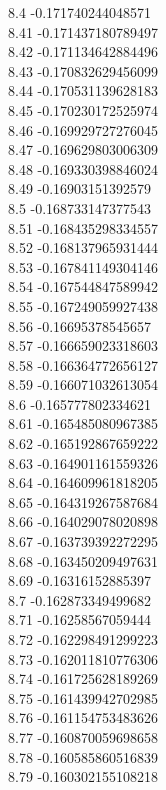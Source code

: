{8.4	-0.171740244048571\\
8.41	-0.171437180789497\\
8.42	-0.171134642884496\\
8.43	-0.170832629456099\\
8.44	-0.170531139628183\\
8.45	-0.170230172525974\\
8.46	-0.169929727276045\\
8.47	-0.169629803006309\\
8.48	-0.169330398846024\\
8.49	-0.16903151392579\\
8.5	-0.168733147377543\\
8.51	-0.168435298334557\\
8.52	-0.168137965931444\\
8.53	-0.167841149304146\\
8.54	-0.167544847589942\\
8.55	-0.167249059927438\\
8.56	-0.16695378545657\\
8.57	-0.166659023318603\\
8.58	-0.166364772656127\\
8.59	-0.166071032613054\\
8.6	-0.165777802334621\\
8.61	-0.165485080967385\\
8.62	-0.165192867659222\\
8.63	-0.164901161559326\\
8.64	-0.164609961818205\\
8.65	-0.164319267587684\\
8.66	-0.164029078020898\\
8.67	-0.163739392272295\\
8.68	-0.163450209497631\\
8.69	-0.16316152885397\\
8.7	-0.162873349499682\\
8.71	-0.16258567059444\\
8.72	-0.162298491299223\\
8.73	-0.162011810776306\\
8.74	-0.161725628189269\\
8.75	-0.161439942702985\\
8.76	-0.161154753483626\\
8.77	-0.160870059698658\\
8.78	-0.160585860516839\\
8.79	-0.160302155108218\\
}
